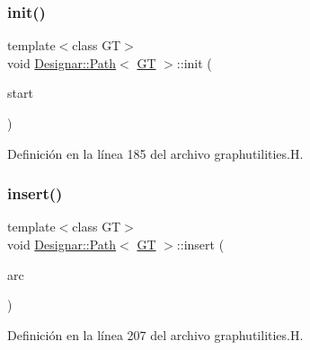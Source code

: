 \subsubsection{\texorpdfstring{init()}{init()}}
{\footnotesize\ttfamily template$<$class GT$>$ \\
void \hyperlink{class_designar_1_1_path}{Designar\+::\+Path}$<$ \hyperlink{demo-buildgraph_8_c_a3001c40d2c31ca87ed96cd7d1334a55e}{GT} $>$\+::init (\begin{DoxyParamCaption}\item[{\hyperlink{class_designar_1_1_path_a7b499fd50e96e3360968d4cfef7a3736}{Node\+Type} \&}]{start }\end{DoxyParamCaption})\hspace{0.3cm}{\ttfamily [inline]}}



Definición en la línea 185 del archivo graphutilities.\+H.

\mbox{\label{class_designar_1_1_path_a0deab29b3241b5df6217bdc705dab131}} 
\subsubsection{\texorpdfstring{insert()}{insert()}\hspace{0.1cm}{\footnotesize\ttfamily [1/2]}}
{\footnotesize\ttfamily template$<$class GT$>$ \\
void \hyperlink{class_designar_1_1_path}{Designar\+::\+Path}$<$ \hyperlink{demo-buildgraph_8_c_a3001c40d2c31ca87ed96cd7d1334a55e}{GT} $>$\+::insert (\begin{DoxyParamCaption}\item[{\hyperlink{class_designar_1_1_path_a6e13966351659cedcf3233098b2b7384}{Arc\+Type} \&}]{arc }\end{DoxyParamCaption})\hspace{0.3cm}{\ttfamily [inline]}}



Definición en la línea 207 del archivo graphutilities.\+H.

\mbox{\label{class_designar_1_1_path_a9f3a77788f312c464d46d4f76f9b9d6a}} 

